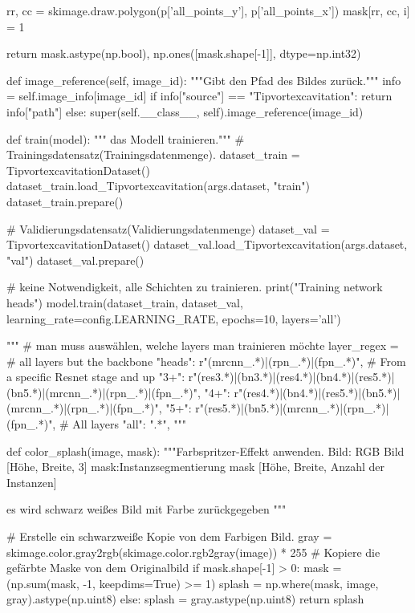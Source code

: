             rr, cc = skimage.draw.polygon(p['all_points_y'], p['all_points_x'])
            mask[rr, cc, i] = 1

        
       
        return mask.astype(np.bool), np.ones([mask.shape[-1]], dtype=np.int32)

    def image_reference(self, image_id):
        """Gibt den Pfad des Bildes zurück."""
        info = self.image_info[image_id]
        if info["source"] == "Tipvortexcavitation":
            return info["path"]
        else:
            super(self.__class__, self).image_reference(image_id)

   
def train(model):
    """ das Modell trainieren."""
    # Trainingsdatensatz(Trainingsdatenmenge).
    dataset_train = TipvortexcavitationDataset()
    dataset_train.load_Tipvortexcavitation(args.dataset, "train")
    dataset_train.prepare()

    # Validierungsdatensatz(Validierungsdatenmenge)
    dataset_val = TipvortexcavitationDataset()
    dataset_val.load_Tipvortexcavitation(args.dataset, "val")
    dataset_val.prepare()

    
    
    
    
    # keine Notwendigkeit, alle Schichten zu trainieren. 
    print("Training network heads")
    model.train(dataset_train, dataset_val,
                learning_rate=config.LEARNING_RATE,
                epochs=10,
                layers='all')
    
    """
    # man muss auswählen, welche layers man trainieren möchte
        layer_regex = {
            # all layers but the backbone
            "heads": r"(mrcnn\_.*)|(rpn\_.*)|(fpn\_.*)",
            # From a specific Resnet stage and up
            "3+": r"(res3.*)|(bn3.*)|(res4.*)|(bn4.*)|(res5.*)|(bn5.*)|(mrcnn\_.*)|(rpn\_.*)|(fpn\_.*)",
            "4+": r"(res4.*)|(bn4.*)|(res5.*)|(bn5.*)|(mrcnn\_.*)|(rpn\_.*)|(fpn\_.*)",
            "5+": r"(res5.*)|(bn5.*)|(mrcnn\_.*)|(rpn\_.*)|(fpn\_.*)",
            # All layers
            "all": ".*",
        }
    """


def color_splash(image, mask):
    """Farbspritzer-Effekt anwenden.
    Bild: RGB Bild [Höhe, Breite, 3]
    mask:Instanzsegmentierung mask [Höhe, Breite, Anzahl der Instanzen]

    es wird schwarz weißes Bild mit Farbe zurückgegeben 
    """
    
    # Erstelle ein schwarzweiße Kopie von dem Farbigen Bild.   
    gray = skimage.color.gray2rgb(skimage.color.rgb2gray(image)) * 255
    # Kopiere die gefärbte Maske von dem Originalbild  
    if mask.shape[-1] > 0:
        mask = (np.sum(mask, -1, keepdims=True) >= 1)
        splash = np.where(mask, image, gray).astype(np.uint8)
    else:
        splash = gray.astype(np.uint8)
    return splash


